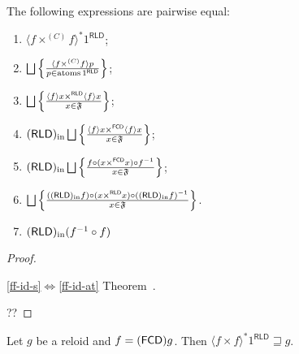 \begin{prop}
  The following expressions are pairwise equal:
  \begin{enumerate}
    \item\label{ff-id-s} $\langle f \times^{(C)} f \rangle^{\ast} 1^{\mathsf{RLD}}$;
    
    \item\label{ff-id-at}  $\bigsqcup \setcond{ \langle f \times^{(C)} f \rangle p }
    {p \in \atoms 1^{\mathsf{RLD}} }$;
    
    \item\label{ff-id-p}  $\bigsqcup \setcond{ \supfun{f} x \times^{\mathsf{RLD}}
    \supfun{f} x }{ x \in \mathfrak{F} }$;
    
    \item\label{ff-id-rp}  $\torldin  \bigsqcup \setcond{ \langle f
    \rangle x \times^{\mathsf{FCD}} \supfun{f} x }
    {x \in \mathfrak{F} }$;
    
    \item\label{ff-id-rc}  $\torldin  \bigsqcup \setcond{ f \circ (x
    \times^{\mathsf{FCD}} x) \circ f^{- 1} }{
    x \in \mathfrak{F} }$;
    
    \item\label{ff-id-rrc}  $\bigsqcup \setcond{ (\torldin f) \circ (x
    \times^{\mathsf{RLD}} x) \circ (\torldin
    f)^{- 1} }{ x \in \mathfrak{F} }$.
    
    \item\label{ff-id-rcomp}  $(\mathsf{RLD})_{\mathrm{in}} (f^{- 1} \circ f)$
  \end{enumerate}
\end{prop}

\begin{proof}
~
\begin{widedisorder}
\item[\ref{ff-id-s}$\Leftrightarrow$\ref{ff-id-at}] Theorem~.
\end{widedisorder}
??
\end{proof}

\begin{prop}
  Let $g$ be a reloid and $f = (\mathsf{FCD}) g$. Then $\langle f
  \times f \rangle^{\ast} 1^{\mathsf{RLD}} \sqsupseteq g$.
\end{prop}

